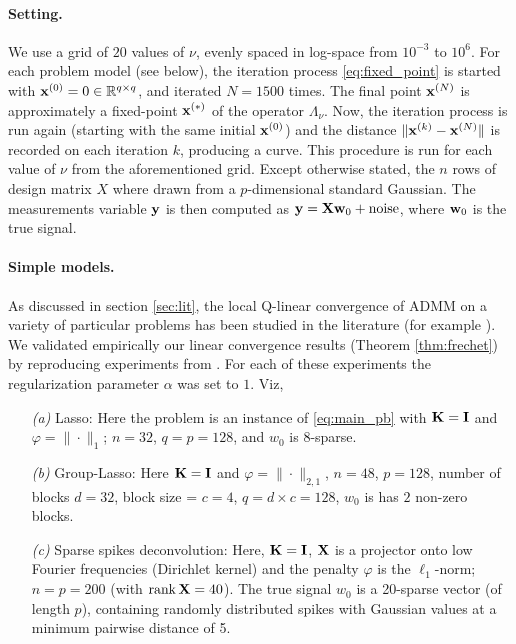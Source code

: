 \paragraph{Setting.}
We use a grid of $20$ values of $\nu$, evenly spaced in
log-space from $10^{-3}$ to $10^6$. For each problem model (see below),
the iteration process \eqref{eq:fixed_point} is started with $\mathbf{x}^{(0)} = 0
\in \mathbb{R}^{q \times q}$, and iterated $N=1500$ times. The final
point $\mathbf{x}^{(N)}$ is approximately a fixed-point $\mathbf{x}^{(*)}$ of the operator
$\Lambda_\nu$. Now, the iteration process is run again (starting with the same
initial $\mathbf{x}^{(0)}$) and the distance $\|\mathbf{x}^{(k)} - \mathbf{x}^{(N)}\|$ is
recorded on each iteration $k$, producing a curve. This procedure is
run for each value of $\nu$ from the aforementioned grid.
Except otherwise stated, the $n$ rows of design matrix $X$ where drawn
from a $p$-dimensional standard Gaussian. The measurements variable
$\mathbf{y}$ is then computed as $\mathbf{y} = \mathbf{X}\mathbf{w}_0 + \textrm{noise}$, where
$\mathbf{w}_0$ is the true signal.

\paragraph{Simple models.}
As discussed in section \ref{sec:lit}, the local Q-linear convergence
of ADMM on a variety of particular problems has been studied in the
literature (for example
\citep{ghadimi2013optimal,nishihara2015general,liang2014activity,liang2015activity}).
We validated empirically our linear convergence
results (Theorem \ref{thm:frechet}) by reproducing experiments from
\citep{liang2014activity,liang2015activity}. For each of these experiments
the regularization parameter $\alpha$ was set to $1$. Viz,

\begin{itemize}
\item[\textit{(a)}] Lasso: Here the problem is an instance of
  \eqref{eq:main_pb} with $\mathbf{K} = \mathbf{I}$ and $\varphi = \|\cdot\|_1$; $n =
  32$, $q=p=128$, and $w_0$ is 8-sparse.
\item[\textit{(b)}] Group-Lasso: Here $\mathbf{K} = \mathbf{I}$ and $\varphi =
  \|\cdot\|_{2,1}$, $n = 48$, $p=128$, number of blocks $d=32$, block
  size = $c=4$, $q = d \times c = 128$, $w_0$ is has $2$ non-zero blocks.
\item[\textit{(c)}] Sparse spikes deconvolution: Here, $\mathbf{K}=\mathbf{I}$, $\mathbf{X}$ is
  a projector  onto low Fourier frequencies (Dirichlet kernel) and the
  penalty $\varphi$ is the $\ell_1$-norm; $n=p=200$ (with $\operatorname{rank} \mathbf{X} =
  40$). The true signal $w_0$ is a 20-sparse vector (of length $p$),
  containing randomly distributed spikes with Gaussian values at a
  minimum pairwise distance of 5.
\end{itemize}

